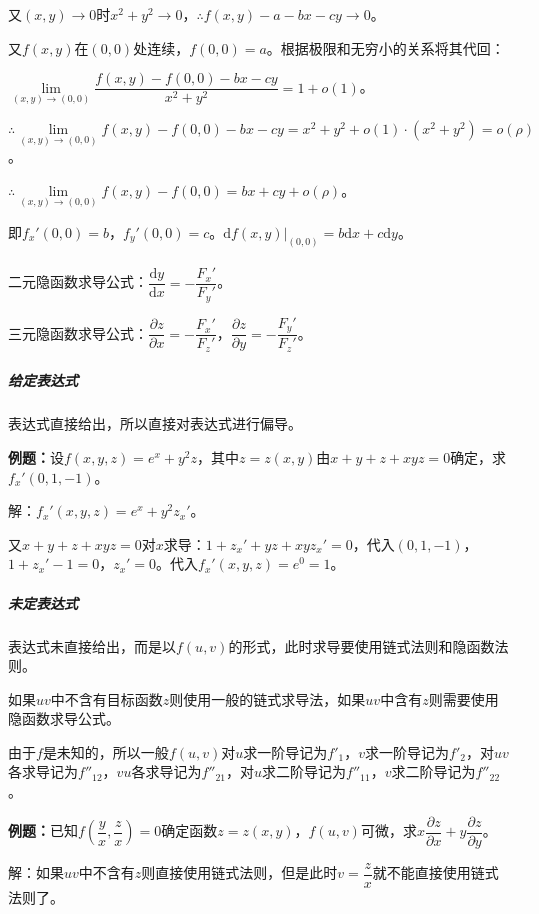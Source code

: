 又$(x,y)\to0$时$x^2+y^2\to0$，$\therefore f(x,y)-a-bx-cy\to0$。

又$f(x,y)$在$(0,0)$处连续，$f(0,0)=a$。根据极限和无穷小的关系将其代回：

$\lim\limits_{(x,y)\to(0,0)}\dfrac{f(x,y)-f(0,0)-bx-cy}{x^2+y^2}=1+o(1)$。

$\therefore\lim\limits_{(x,y)\to(0,0)}f(x,y)-f(0,0)-bx-cy=x^2+y^2+o(1)\cdot(x^2+y^2)=o(\rho)$。

$\therefore\lim\limits_{(x,y)\to(0,0)}f(x,y)-f(0,0)=bx+cy+o(\rho)$。

即$f_x'(0,0)=b$，$f_y'(0,0)=c$。$\textrm{d}f(x,y)|_{(0,0)}=b\textrm{d}x+c\textrm{d}y$。

\paragraph{} \leavevmode \medskip

二元隐函数求导公式：$\dfrac{\textrm{d}y}{\textrm{d}x}=-\dfrac{F_x'}{F_y'}$。

三元隐函数求导公式：$\dfrac{\partial z}{\partial x}=-\dfrac{F_x'}{F_z'}$，$\dfrac{\partial z}{\partial y}=-\dfrac{F_y'}{F_z'}$。

\subparagraph{给定表达式} \leavevmode \medskip

表达式直接给出，所以直接对表达式进行偏导。

\textbf{例题：}设$f(x,y,z)=e^x+y^2z$，其中$z=z(x,y)$由$x+y+z+xyz=0$确定，求$f_x'(0,1,-1)$。

解：$f_x'(x,y,z)=e^x+y^2z_x'$。

又$x+y+z+xyz=0$对$x$求导：$1+z_x'+yz+xyz_x'=0$，代入$(0,1,-1)$，$1+z_x'-1=0$，$z_x'=0$。代入$f_x'(x,y,z)=e^0=1$。

\subparagraph{未定表达式} \leavevmode \medskip

表达式未直接给出，而是以$f(u,v)$的形式，此时求导要使用链式法则和隐函数法则。

如果$uv$中不含有目标函数$z$则使用一般的链式求导法，如果$uv$中含有$z$则需要使用隐函数求导公式。

由于$f$是未知的，所以一般$f(u,v)$对$u$求一阶导记为$f'_1$，$v$求一阶导记为$f'_2$，对$uv$各求导记为$f''_{12}$，$vu$各求导记为$f''_{21}$，对$u$求二阶导记为$f''_{11}$，$v$求二阶导记为$f''_{22}$。

\textbf{例题：}已知$f\left(\dfrac{y}{x},\dfrac{z}{x}\right)=0$确定函数$z=z(x,y)$，$f(u,v)$可微，求$x\dfrac{\partial z}{\partial x}+y\dfrac{\partial z}{\partial y}$。

解：如果$uv$中不含有$z$则直接使用链式法则，但是此时$v=\dfrac{z}{x}$就不能直接使用链式法则了。

